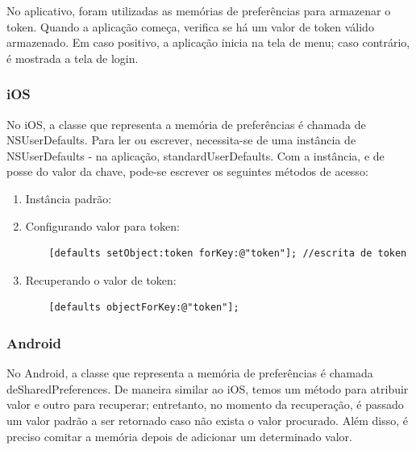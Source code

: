 			No aplicativo, foram utilizadas as memórias de preferências para armazenar o token. Quando a aplicação começa, verifica se há um valor de token válido armazenado. Em caso positivo, a aplicação inicia na tela de menu; caso contrário, é mostrada a tela de login.
     
    \subsubsection{iOS}
            
			No iOS, a classe que representa a memória de preferências é chamada de NSUserDefaults. Para ler ou escrever, necessita-se de uma instância de NSUserDefaults - na aplicação, standardUserDefaults. Com a instância, e de posse do valor da chave, pode-se escrever os seguintes métodos de acesso:
\begin{enumerate}     
\item Instância padrão:
     
\item Configurando valor para token:
\begin{lstlisting}   
    [defaults setObject:token forKey:@"token"]; //escrita de token
  \end{lstlisting}    
\item Recuperando o valor de token:
\begin{lstlisting}   
    [defaults objectForKey:@"token"];
\end{lstlisting} 
\end{enumerate}     
    \subsubsection{Android}
     
    No Android, a classe que representa a memória de preferências é chamada deSharedPreferences. De maneira similar ao iOS, temos um método para atribuir valor e outro para recuperar; entretanto, no momento da recuperação, é passado um valor padrão a ser retornado caso não exista o valor procurado.  Além disso, é preciso comitar a memória depois de adicionar um determinado valor.
    
